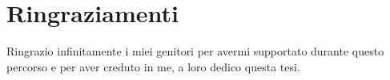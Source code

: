 \chapter*{Ringraziamenti}

Ringrazio infinitamente i miei genitori per avermi supportato durante questo percorso e per aver creduto in me, a loro dedico questa tesi.